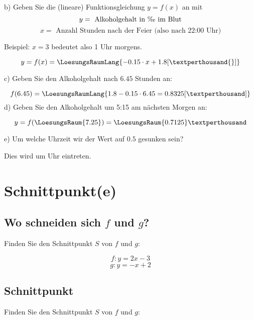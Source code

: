 b) Geben Sie die (lineare) Funktionsgleichung $y=f(x)$ an mit
$$y = \text{ Alkoholgehalt in \textperthousand{} im Blut}$$
$$x = \text{ Anzahl Stunden nach der Feier (also nach 22:00 Uhr)}$$

Beispiel: $x=3$ bedeutet also 1 Uhr morgens.

$$y = f(x) = \LoesungsRaumLang{-0.15\cdot{}x + 1.8 [\text{\textperthousand{}}]}$$

c) Geben Sie den Alkoholgehalt nach $6.45$ Stunden an:

$$f(6.45) = \LoesungsRaumLang{1.8-0.15\cdot{}6.45 = 0.8325
[\text{\textperthousand}]}$$
\TNTeop{}
d) Geben Sie den Alkoholgehalt um 5:15 am nächsten Morgen an:

$$y = f(\LoesungsRaum{7.25}) = \LoesungsRaum{0.7125}\textperthousand$$


e) Um welche Uhrzeit wir der Wert auf $0.5$\textperthousand{} gesunken
sein?

\vspace{5mm}
Dies wird um  Uhr eintreten.

\section{Schnittpunkt(e)}
\subsection{Wo schneiden sich $f$ und $g$?}
Finden Sie den Schnittpunkt $S$ von $f$ und $g$:

$$f: y= 2x-3$$
$$g: y=-x+2$$



\newpage

\subsection{Schnittpunkt}
Finden Sie den Schnittpunkt $S$ von $f$ und $g$:

